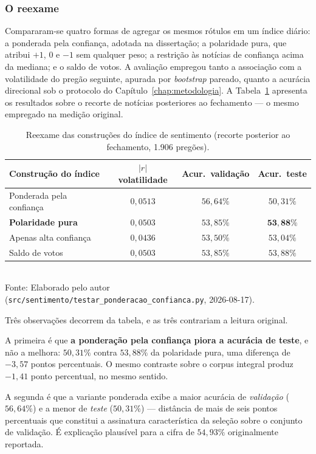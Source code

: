 \subsubsection{O reexame}

Compararam-se quatro formas de agregar os mesmos rótulos em um índice diário: a ponderada pela
confiança, adotada na dissertação; a polaridade pura, que atribui $+1$, $0$ e $-1$ sem qualquer
peso; a restrição às notícias de confiança acima da mediana; e o saldo de votos. A avaliação
empregou tanto a associação com a volatilidade do pregão seguinte, apurada por \textit{bootstrap}
pareado, quanto a acurácia direcional sob o protocolo do Capítulo~\ref{chap:metodologia}. A
Tabela~\ref{tab:revisao_ponderacao} apresenta os resultados sobre o recorte de notícias posteriores
ao fechamento --- o mesmo empregado na medição original.

\begin{table}[htpb]
\centering
\caption{Reexame das construções do índice de sentimento (recorte posterior ao fechamento, 1.906 pregões).}
\label{tab:revisao_ponderacao}
\begin{tabular}{l c c c}
\hline
\textbf{Construção do índice} & \textbf{$|r|$ volatilidade} & \textbf{Acur.\ validação} & \textbf{Acur.\ teste} \\ \hline
Ponderada pela confiança & $0{,}0513$ & $56{,}64\%$ & $50{,}31\%$ \\
\textbf{Polaridade pura} & $0{,}0503$ & $53{,}85\%$ & $\mathbf{53{,}88\%}$ \\
Apenas alta confiança & $0{,}0436$ & $53{,}50\%$ & $53{,}04\%$ \\
Saldo de votos & $0{,}0503$ & $53{,}85\%$ & $53{,}88\%$ \\
\hline
\end{tabular}
\vspace{0.2cm}
{\small \\ Fonte: Elaborado pelo autor (\texttt{src/sentimento/testar\_ponderacao\_confianca.py}, 2026-08-17).}
\end{table}

Três observações decorrem da tabela, e as três contrariam a leitura original.

A primeira é que \textbf{a ponderação pela confiança piora a acurácia de teste}, e não a melhora:
$50{,}31\%$ contra $53{,}88\%$ da polaridade pura, uma diferença de $-3{,}57$ pontos percentuais. O
mesmo contraste sobre o corpus integral produz $-1{,}41$ ponto percentual, no mesmo sentido.

A segunda é que a variante ponderada exibe a maior acurácia de \emph{validação} ($56{,}64\%$) e a
menor de \emph{teste} ($50{,}31\%$) --- distância de mais de seis pontos percentuais que constitui a
assinatura característica da seleção sobre o conjunto de validação. É explicação plausível para a
cifra de $54{,}93\%$ originalmente reportada.


